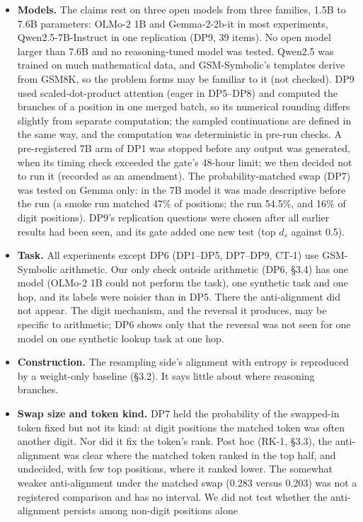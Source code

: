 \documentclass[
  10pt,
  a4paper,
]{article}
\providecommand{\tightlist}{%
  \setlength{\itemsep}{0pt}\setlength{\parskip}{0pt}}
\begin{document}
\begin{itemize}
\tightlist
\item
  \textbf{Models.} The claims rest on three open models from three families, 1.5B to 7.6B parameters: OLMo-2 1B and Gemma-2-2b-it in most experiments, Qwen2.5-7B-Instruct in one replication (DP9, 39
  items). No open model larger than 7.6B and no reasoning-tuned model was tested. Qwen2.5 was trained on much mathematical data, and GSM-Symbolic's templates derive from GSM8K, so the problem forms
  may be familiar to it (not checked). DP9 used scaled-dot-product attention (eager in DP5--DP8) and computed the branches of a position in one merged batch, so its numerical rounding differs slightly
  from separate computation; the sampled continuations are defined in the same way, and the computation was deterministic in pre-run checks. A pre-registered 7B arm of DP1 was stopped before any
  output was generated, when its timing check exceeded the gate's 48-hour limit; we then decided not to run it (recorded as an amendment). The probability-matched swap (DP7) was tested on Gemma only:
  in the 7B model it was made descriptive before the run (a smoke run matched 47\% of positions; the run 54.5\%, and 16\% of digit positions). DP9's replication questions were chosen after all earlier
  results had been seen, and its gate added one new test (top \(d_{s}\) against 0.5).
\item
  \textbf{Task.} All experiments except DP6 (DP1--DP5, DP7--DP9, CT-1) use GSM-Symbolic arithmetic. Our only check outside arithmetic (DP6, §3.4) has one model (OLMo-2 1B could not perform the task),
  one synthetic task and one hop, and its labels were noisier than in DP5. There the anti-alignment did not appear. The digit mechanism, and the reversal it produces, may be specific to arithmetic;
  DP6 shows only that the reversal was not seen for one model on one synthetic lookup task at one hop.
\item
  \textbf{Construction.} The resampling side's alignment with entropy is reproduced by a weight-only baseline (§3.2). It says little about where reasoning branches.
\item
  \textbf{Swap size and token kind.} DP7 held the probability of the swapped-in token fixed but not its kind: at digit positions the matched token was often another digit. Nor did it fix the token's
  rank. Post hoc (RK-1, §3.3), the anti-alignment was clear where the matched token ranked in the top half, and undecided, with few top positions, where it ranked lower. The somewhat weaker
  anti-alignment under the matched swap (0.283 versus 0.203) was not a registered comparison and has no interval. We did not test whether the anti-alignment persists among non-digit positions alone

\end{itemize}
\end{document}
